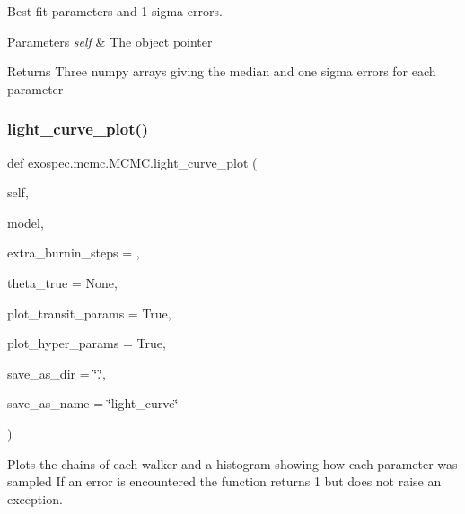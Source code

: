 Best fit parameters and 1 sigma errors. 


\begin{DoxyParams}{Parameters}
{\em self} & The object pointer \\
\hline
\end{DoxyParams}
\begin{DoxyReturn}{Returns}
Three numpy arrays giving the median and one sigma errors for each parameter 
\end{DoxyReturn}
\mbox{\label{classexospec_1_1mcmc_1_1_m_c_m_c_ab2c5cc870e2b384534404f3bc667e039}} 
\subsubsection{\texorpdfstring{light\+\_\+curve\+\_\+plot()}{light\_curve\_plot()}}
{\footnotesize\ttfamily def exospec.\+mcmc.\+M\+C\+M\+C.\+light\+\_\+curve\+\_\+plot (\begin{DoxyParamCaption}\item[{}]{self,  }\item[{}]{model,  }\item[{}]{extra\+\_\+burnin\+\_\+steps = {},  }\item[{}]{theta\+\_\+true = {\ttfamily None},  }\item[{}]{plot\+\_\+transit\+\_\+params = {\ttfamily True},  }\item[{}]{plot\+\_\+hyper\+\_\+params = {\ttfamily True},  }\item[{}]{save\+\_\+as\+\_\+dir = {\ttfamily \char`\"{}.\char`\"{}},  }\item[{}]{save\+\_\+as\+\_\+name = {\ttfamily \char`\"{}light\+\_\+curve\char`\"{}} }\end{DoxyParamCaption})}



Plots the chains of each walker and a histogram showing how each parameter was sampled If an error is encountered the function returns 1 but does not raise an exception. 

